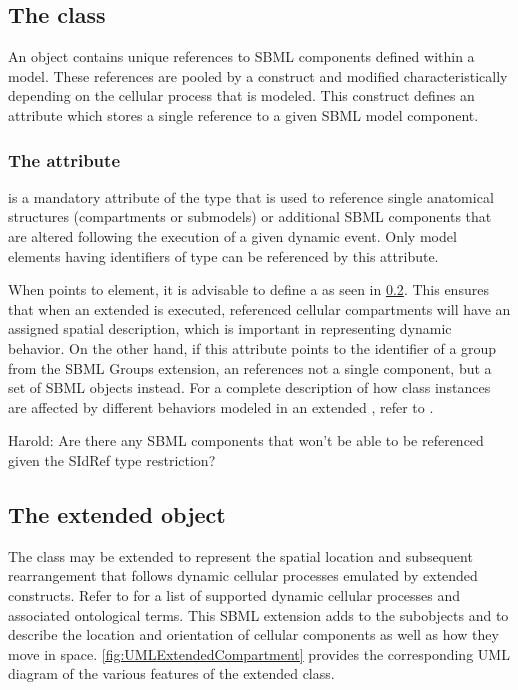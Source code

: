 \subsection{The  class}
\label{subsec:Element}
An \Element object contains unique references to SBML components defined within a model. These references are pooled by a \ListOfElements construct and modified characteristically depending on the cellular process that is modeled. This construct defines an  attribute which stores a single reference to a given SBML model component.

\subsubsection{The  attribute}
\label{attr:element}

 is a mandatory attribute of the type  that is used to reference single anatomical structures (compartments or submodels) or additional SBML components that are altered following the execution of a given dynamic event. Only model elements having identifiers of type  can be referenced by this attribute. 

When  points to \Compartment element, it is advisable to define a \ListOfSpatialComponents as seen in \ref{subsec:extCompartment}. This ensures that when an extended \Event is executed, referenced cellular compartments will have an assigned spatial description, which is important in representing dynamic behavior. On the other hand, if this attribute points to the identifier of a group from the SBML Groups extension, an \Element references not a single component, but a set of SBML objects instead. For a complete description of how \Element class instances are affected by different behaviors modeled in an extended \Event, refer to .

{\color{red} Harold: \notice Are there any SBML components that won't be able to be referenced given the SIdRef type restriction?}

\subsection{The extended  object}
\label{subsec:extCompartment}

The \Compartment class may be extended to represent the spatial location and subsequent rearrangement that follows dynamic cellular processes emulated by extended \Event constructs. Refer to  for a list of supported dynamic cellular processes and associated ontological terms. This SBML extension adds to \Compartment the subobjects \ListOfSpatialComponents and \SpatialComponent to describe the location and orientation of cellular components as well as how they move in space. \ref{fig:UMLExtendedCompartment} provides the corresponding UML diagram of the various features of the extended \Compartment class. 

